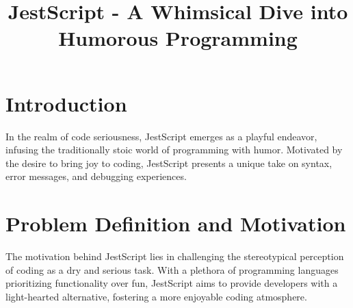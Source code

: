 \title{JestScript - A Whimsical Dive into Humorous Programming}

\def\myname{John von Neumann}

\def\adv{Dr. Donald Knuth}
\def\advemail{sample@sjsu.edu}

\def\comone{Dr. Edsger W. Dijkstra}
\def\comoneemail{sample@sjsu.edu}

\def\comtwo{Dr. Claude Shannon}
\def\comtwoemail{sample@sjsu.edu}
\def\comtwoaffil{}

\def\semester{Summer}
\def\year{1822}


\def\keywords{programming language, enjoyable coding, programming language design, user experience, light-weight programming language}


\maketitle %


\section{Introduction}
In the realm of code seriousness, JestScript emerges as a playful endeavor, infusing the traditionally stoic world of programming with humor. 
Motivated by the desire to bring joy to coding, JestScript presents a unique take on syntax, error messages, and debugging experiences.

\makekeywords %

\section{Problem Definition and Motivation}
The motivation behind JestScript lies in challenging the stereotypical perception of coding as a dry and serious task. With a plethora of programming languages prioritizing functionality over fun, JestScript aims to provide developers with a light-hearted alternative, fostering a more enjoyable coding
atmosphere.

